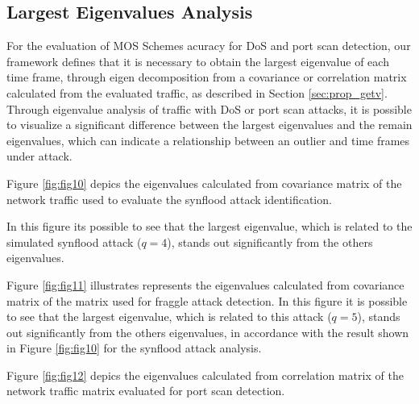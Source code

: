 \documentclass{bmcart}
\begin{document}
\subsection{Largest Eigenvalues Analysis}
\label{sec:largesteigenvaluesanalysis}

For the evaluation of MOS Schemes acuracy for DoS and port scan detection, our framework defines that it is necessary to obtain the largest eigenvalue of each time frame, through eigen decomposition from a covariance or correlation matrix calculated from the evaluated traffic, as described in Section \ref{sec:prop_getv}. Through eigenvalue analysis of traffic with DoS or port scan attacks, it is possible to visualize a significant difference between the largest eigenvalues and the remain eigenvalues, which can indicate a relationship between an outlier and time frames under attack.

Figure \ref{fig:fig10} depics the eigenvalues calculated from covariance matrix of the network traffic used to evaluate the synflood attack identification. 


In this figure its possible to see that the largest eigenvalue, which is related to the simulated synflood attack ($q = 4$), stands out significantly from the others eigenvalues.

Figure \ref{fig:fig11} illustrates represents the eigenvalues calculated from covariance matrix of the matrix used for fraggle attack detection. In this figure it is possible to see that the largest eigenvalue, which is related to this attack ($q = 5$), stands out significantly from the others eigenvalues, in accordance with the result shown in Figure \ref{fig:fig10} for the synflood attack analysis.


Figure \ref{fig:fig12} depics the eigenvalues calculated from correlation matrix of the network traffic matrix evaluated for port scan detection. 
\end{document}
